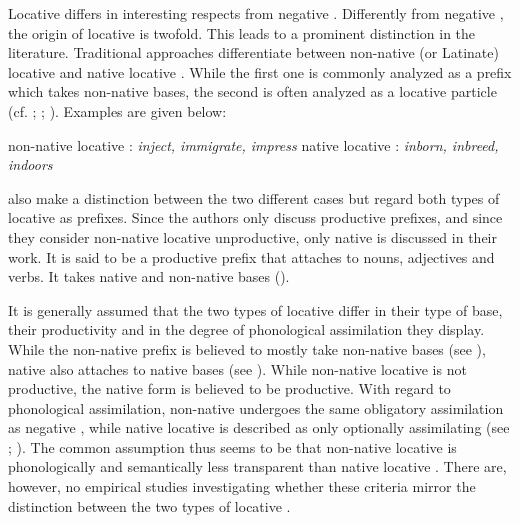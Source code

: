 Locative  differs in interesting respects from negative . Differently from negative , the origin of locative  is twofold. This leads to a prominent distinction in the literature. Traditional approaches differentiate between non-native (or Latinate) locative  and native locative .  While the first one is commonly analyzed as a prefix which takes non-native bases, the second is often analyzed as a locative particle (cf. \citealt[497 ff]{Jespersen.1965}; \citealt[115,163 f]{Marchand.1969}; \citealt[1685]{Bauer.2002}). Examples are given below:

\begin{exe}
	\ex non-native locative : \hspace{0.7cm} \textit{inject, immigrate, impress}
	\ex native locative : \hspace{1.4cm} \textit{inborn, inbreed, indoors}
\end{exe}

\cite{Bauer.2013} also make a distinction between the two different cases but regard both types of locative  as prefixes. Since the authors only discuss productive prefixes, and since they consider non-native locative  unproductive,  only native  is discussed in their work. It is said to be a productive prefix that attaches to nouns, adjectives and verbs. It takes native and non-native bases (\citealt[334, 340]{Bauer.2013}).
 
 It is generally assumed that the two types of locative  differ in their type of base, their productivity and in the degree of phonological assimilation they display. While the non-native prefix is believed to mostly take non-native bases (see \citealt[499]{Jespersen.1965}), native  also attaches to native bases (see \citealt[334]{Bauer.2013}). While non-native locative  is not productive, the native form is believed to be productive. With regard to phonological assimilation, non-native  undergoes the same obligatory assimilation as negative , while native locative  is described as only optionally assimilating (see \citealt[499]{Jespersen.1965}; \citealt[335]{Bauer.2013}). The common assumption thus seems to be that non-native locative  is phonologically and semantically less transparent than native locative . There are, however, no empirical studies investigating whether these criteria mirror the distinction between the two types of locative . 
 

